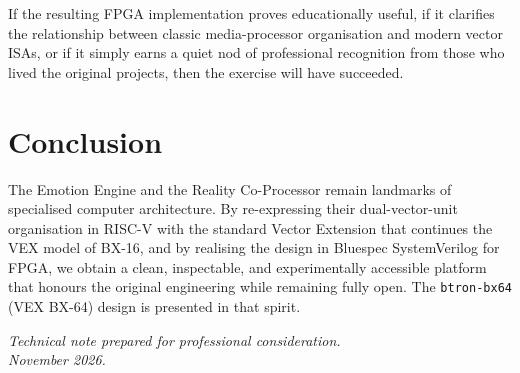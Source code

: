 \documentclass[11pt,a4paper]{article}
\begin{document}
If the resulting FPGA implementation proves educationally useful, if it clarifies the relationship between classic media-processor organisation and modern vector ISAs, or if it simply earns a quiet nod of professional recognition from those who lived the original projects, then the exercise will have succeeded.

\section{Conclusion}

The Emotion Engine and the Reality Co-Processor remain landmarks of specialised computer architecture. By re-expressing their dual-vector-unit organisation in RISC-V with the standard Vector Extension that continues the VEX model of BX-16, and by realising the design in Bluespec SystemVerilog for FPGA, we obtain a clean, inspectable, and experimentally accessible platform that honours the original engineering while remaining fully open. The \texttt{btron-bx64} (VEX BX-64) design is presented in that spirit.

\vspace{1.5em}
\noindent\textit{Technical note prepared for professional consideration.\\
November 2026.}
\end{document}
